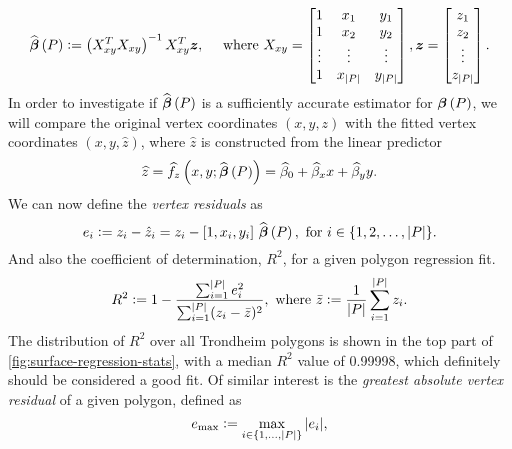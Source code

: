 \begin{align*}
  \widehat{\boldsymbol{\beta}}\left(P\right)
  \vcentcolon=
  \left( X_{xy}^T X_{xy} \right)^{-1} X_{xy}^T \boldsymbol{z},
  \hspace{1em}
  \text{ where }
  X_{xy}
  =
  \begin{bmatrix}
    1 & x_{1} & y_{1} \\
    1 & x_{2} & y_{2} \\
    \vdots & \vdots & \vdots \\
    1 & x_{|P|} & y_{|P|} \\
  \end{bmatrix},
  \boldsymbol{z}
  =
  \begin{bmatrix}
     z_{1} \\
     z_{2} \\
     \vdots \\
     z_{|P|} \\
  \end{bmatrix}.
\end{align*}
%
In order to investigate if $\widehat{\boldsymbol{\beta}}\left(P\right)$ is a sufficiently accurate estimator for $\boldsymbol{\beta}\left(P\right)$, we will compare the original vertex coordinates $(x, y, z)$ with the fitted vertex coordinates $(x, y, \hat{z})$, where $\hat{z}$ is constructed from the linear predictor
\begin{equation*}
  \widehat{z}
  =
  \widehat{f}_z\left(x, y; \widehat{\boldsymbol{\beta}}\left(P\right)\right)
  =
  \widehat{\beta}_{0}
  + \widehat{\beta}_{x} x
  + \widehat{\beta}_{y} y.
\end{equation*}
%
We can now define the \textit{vertex residuals} as
%
\begin{equation*}
  e_i
  \vcentcolon=
  z_i - \hat{z}_i
  =
  z_i - [1, x_i, y_i]~\widehat{\boldsymbol{\beta}}\left(P\right),
  \text{ for } i \in \{1, 2, \ldots, |P|\}.
\end{equation*}
%
And also the coefficient of determination, $R^2$, for a given polygon regression fit.
%
\begin{equation*}
  R^2
  \defeq
    1
    -
    \frac{
      \sum_{i = 1}^{|P|} e_i^2
    }{%
    \sum_{i = 1}^{|P|} (z_i - \bar{z})^2
    },
  \text{ where }
  \bar{z} \defeq \frac{1}{|P|} \sum_{i=1}^{|P|} z_i.
\end{equation*}
%
The distribution of $R^2$ over all Trondheim polygons is shown in the top part of \cref{fig:surface-regression-stats}, with a median $R^2$ value of 0.99998, which definitely should be considered a good fit.
Of similar interest is the \textit{greatest absolute vertex residual} of a given polygon, defined as 
\begin{equation*}
  e_{\mathrm{max}}
  \vcentcolon=
  \max_{i \in \{1, \ldots, |P|\}}
    |e_i|,
\end{equation*}
